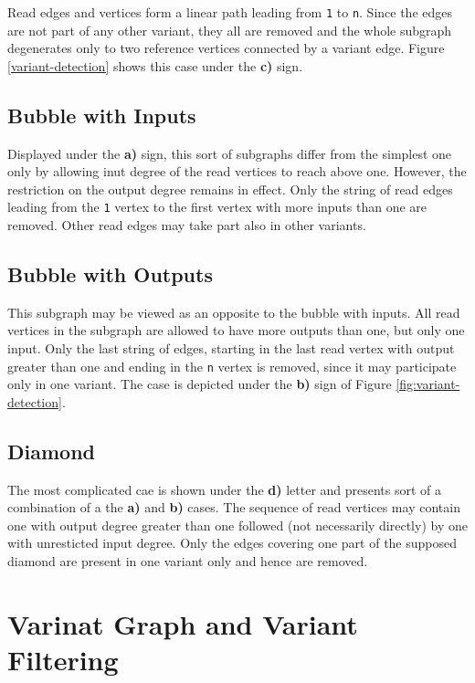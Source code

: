 Read edges and vertices form a linear path leading from \texttt{1} to \texttt{n}. Since the edges are not part of any other variant, they all are removed and the whole subgraph degenerates only to two reference vertices connected by a variant edge. Figure \ref{variant-detection} shows this case under the \textbf{c)} sign.

\subsection{Bubble with Inputs}
\label{subsec:bubble-with-inputs}

Displayed under the \textbf{a)} sign, this sort of subgraphs differ from the simplest one only by allowing inut degree of the read vertices to reach above one. However, the restriction on the output degree remains in effect. Only the string of read edges leading from the \texttt{1} vertex to the first vertex with more inputs than one are removed. Other read edges may take part also in other variants.

\subsection{Bubble with Outputs}
\label{subsec:bubble-with-outputs}

This subgraph may be viewed as an opposite to the bubble with inputs. All read vertices in the subgraph are allowed to have more outputs than one, but only one input. Only the last string of edges, starting in the last read vertex with output greater than one and ending in the \texttt{n} vertex is removed, since it may participate only in one variant. The case is depicted under the \textbf{b)} sign of Figure \ref{fig:variant-detection}.

\subsection{Diamond}
\label{subsec:diamond}

The most complicated cae is shown under the \textbf{d)} letter and presents sort of a combination of a the \textbf{a)} and \textbf{b)} cases. The sequence of read vertices may contain one with output degree greater than one followed (not necessarily directly) by one with unresticted input degree. Only the edges covering one part of the supposed diamond are present in one variant only and hence are removed. 

\section{Varinat Graph and Variant Filtering}
\label{sec:variant-graph-and-variant-filtering}


